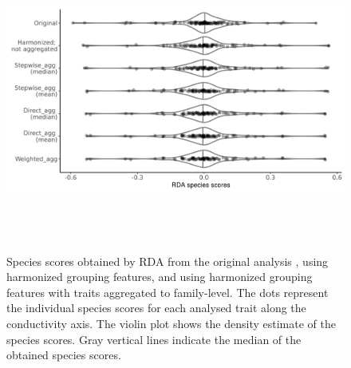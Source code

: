 \documentclass{article}
\begin{document}
\begin{figure}[H]
    \label{fig:rda_species_scores}
    \centering
    \includegraphics[width=16.5cm, height=10cm]{Species_scores_rda.png}
    \caption{Species scores obtained by RDA from the original analysis \cite{szocs_effects_2014}, using harmonized grouping features, and using harmonized grouping features with traits aggregated to family-level. The dots represent the individual species scores for each analysed trait along the conductivity axis. The violin plot shows the density estimate of the species scores. Gray vertical lines indicate the median of the obtained species scores.}
\end{figure}
\end{document}
